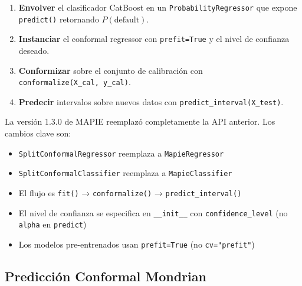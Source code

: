 \documentclass[
  spanish,
  11pt,
  letterpaper,
]{scrbook}
\providecommand{\tightlist}{%
  \setlength{\itemsep}{0pt}\setlength{\parskip}{0pt}}
\theoremstyle{plain}
\theoremstyle{remark}
\begin{document}
\begin{enumerate}
\def\labelenumi{\arabic{enumi}.}
\tightlist
\item
  \textbf{Envolver} el clasificador CatBoost en un
  \texttt{ProbabilityRegressor} que expone \texttt{predict()} retornando
  \(P(\text{default})\).
\item
  \textbf{Instanciar} el conformal regressor con \texttt{prefit=True} y
  el nivel de confianza deseado.
\item
  \textbf{Conformizar} sobre el conjunto de calibración con
  \texttt{conformalize(X\_cal,\ y\_cal)}.
\item
  \textbf{Predecir} intervalos sobre nuevos datos con
  \texttt{predict\_interval(X\_test)}.
\end{enumerate}

\begin{tcolorbox}[enhanced jigsaw, arc=.35mm, bottomrule=.15mm, bottomtitle=1mm, breakable, colback=white, colbacktitle=quarto-callout-note-color!10!white, colframe=quarto-callout-note-color-frame, coltitle=black, left=2mm, leftrule=.75mm, opacityback=0, opacitybacktitle=0.6, rightrule=.15mm, title=\textcolor{quarto-callout-note-color}{\faInfo}\hspace{0.5em}{API de MAPIE 1.3.0}, titlerule=0mm, toprule=.15mm, toptitle=1mm]

La versión 1.3.0 de MAPIE reemplazó completamente la API anterior. Los
cambios clave son:

\begin{itemize}
\tightlist
\item
  \texttt{SplitConformalRegressor} reemplaza a \texttt{MapieRegressor}
\item
  \texttt{SplitConformalClassifier} reemplaza a \texttt{MapieClassifier}
\item
  El flujo es \texttt{fit()} → \texttt{conformalize()} →
  \texttt{predict\_interval()}
\item
  El nivel de confianza se especifica en \texttt{\_\_init\_\_} con
  \texttt{confidence\_level} (no \texttt{alpha} en \texttt{predict})
\item
  Los modelos pre-entrenados usan \texttt{prefit=True} (no
  \texttt{cv="prefit"})
\end{itemize}

\end{tcolorbox}

\subsection{Predicción Conformal Mondrian}\label{sec-mondrian-primer}
\end{document}
